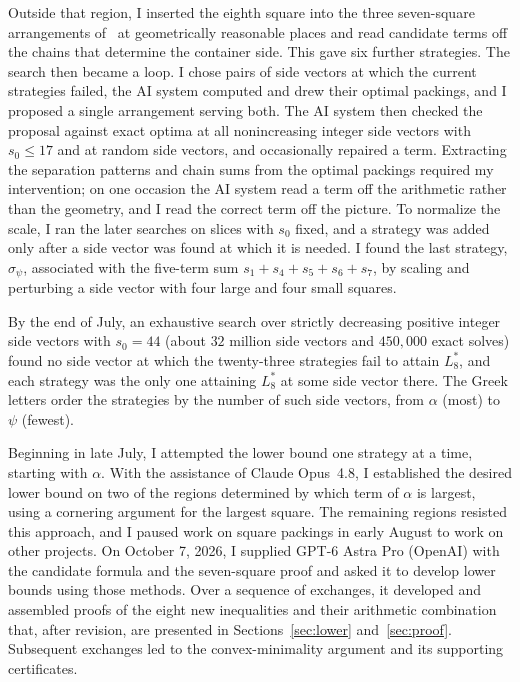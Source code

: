 \documentclass[12pt]{amsart}
\theoremstyle{definition}
\theoremstyle{remark}
\numberwithin{equation}{section}
\numberwithin{figure}{section}
\numberwithin{table}{section}
\begin{document}
Outside that region, I inserted the eighth square into the three
seven-square arrangements of~\cite{BadgerSeven} at geometrically
reasonable places and read candidate terms off the chains that determine
the container side. This gave six further strategies. The search then
became a loop. I chose pairs of side vectors at which the current strategies
failed, the AI system computed and drew their optimal packings, and I
proposed a single arrangement serving both. The AI system then checked the
proposal against exact optima at all nonincreasing integer side vectors
with $s_0\le17$ and at random side vectors, and occasionally repaired a
term. Extracting the separation patterns and chain sums from the
optimal packings required my intervention; on one occasion the AI system
read a term off the arithmetic rather than the geometry, and I read the
correct term off the picture. To normalize the scale, I ran the later
searches on slices with $s_0$ fixed, and a strategy was added only after a
side vector was found at which it is needed. I found the last
strategy, $\sigma_\psi$, associated with the five-term sum $s_1+s_4+s_5+s_6+s_7$,
by scaling and perturbing a side vector with four large and four small
squares.

By the end of July, an exhaustive search over strictly decreasing positive integer side
vectors with $s_0=44$ (about $32$ million side vectors and $450{,}000$ exact solves) found no side vector
at which the twenty-three strategies fail to attain $L_8^*$, and each
strategy was the only one attaining $L_8^*$ at some side vector there. The
Greek letters order the strategies by the number of such side vectors, from
$\alpha$ (most) to $\psi$ (fewest).

Beginning in late July, I attempted the lower bound one strategy
at a time, starting with $\alpha$. With the assistance of Claude
Opus~4.8, I established the desired lower bound on two of the
regions determined by which term of $\alpha$ is largest, using a
cornering argument for the largest square.
The remaining regions resisted this approach, and I paused work
on square packings in early August to work on other projects.
On October 7, 2026, I supplied GPT-6 Astra Pro (OpenAI) with the
candidate formula and the seven-square proof and asked it to
develop lower bounds using those methods. Over a sequence of
exchanges, it developed and assembled proofs of the eight new
inequalities and their arithmetic combination that, after
revision, are presented in Sections~\ref{sec:lower}
and~\ref{sec:proof}. Subsequent exchanges led to the
convex-minimality argument and its supporting certificates.
\end{document}
